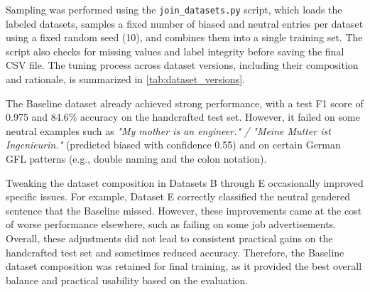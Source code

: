     Sampling was performed using the \texttt{join\_datasets.py} script, which loads the labeled datasets, samples a fixed number of biased and neutral entries per dataset using a fixed random seed (10), and combines them into a single training set. The script also checks for missing values and label integrity before saving the final CSV file. The tuning process across dataset versions, including their composition and rationale, is summarized in \autoref{tab:dataset_versions}.

    The Baseline dataset already achieved strong performance, with a test F1 score of 0.975 and 84.6\% accuracy on the handcrafted test set. However, it failed on some neutral examples such as \textit{"My mother is an engineer." / "Meine Mutter ist Ingenieurin."} (predicted biased with confidence 0.55) and on certain German GFL patterns (e.g., double naming and the colon notation).

    Tweaking the dataset composition in Datasets B through E occasionally improved specific issues. For example, Dataset E correctly classified the neutral gendered sentence that the Baseline missed. However, these improvements came at the cost of worse performance elsewhere, such as failing on some job advertisements. Overall, these adjustments did not lead to consistent practical gains on the handcrafted test set and sometimes reduced accuracy. Therefore, the Baseline dataset composition was retained for final training, as it provided the best overall balance and practical usability based on the evaluation.

